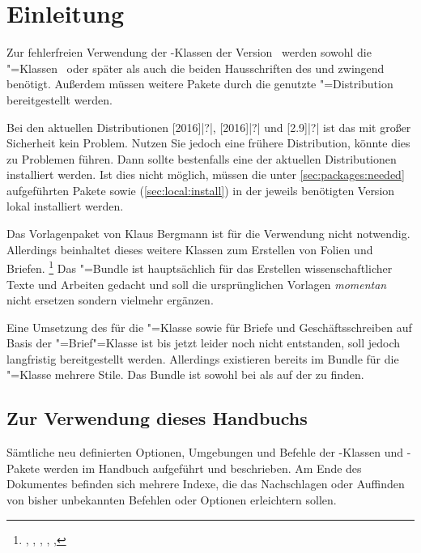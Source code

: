 \chapter{Einleitung}
%
Zur fehlerfreien Verwendung der \TUDScript-Klassen der Version~\vTUDScript{} 
werden sowohl die \KOMAScript"=Klassen~\vKOMAScript{} oder später als auch die 
beiden Hausschriften des \CDs \Univers und \DIN zwingend benötigt. Außerdem 
müssen weitere Pakete durch die genutzte "=Distribution 
bereitgestellt werden. 

Bei den aktuellen Distributionen
%
[2016]|?|,
[2016]|?| und 
[2.9]|?|
ist das mit großer Sicherheit kein Problem. Nutzen Sie jedoch eine frühere 
Distribution, könnte dies zu Problemen führen. Dann sollte bestenfalls eine der 
aktuellen Distributionen installiert werden. Ist dies nicht möglich, müssen die 
unter \autoref{sec:packages:needed} aufgeführten Pakete sowie \TUDScript 
(\autoref{sec:local:install}) in der jeweils benötigten Version lokal 
installiert werden.

Das Vorlagenpaket von Klaus Bergmann ist für die Verwendung nicht notwendig. 
Allerdings beinhaltet dieses weitere Klassen zum Erstellen von Folien 
und Briefen.%
\footnote{%
  , , , , 
  , %
}
Das \TUDScript"=Bundle ist hauptsächlich für das Erstellen wissenschaftlicher 
Texte und Arbeiten gedacht und soll die ursprünglichen Vorlagen \emph{momentan} 
nicht ersetzen sondern vielmehr ergänzen. 

Eine Umsetzung des \CDs für die "=Klasse sowie für Briefe und 
Geschäftsschreiben auf Basis der \KOMAScript"=Brief"=Klasse  
ist bis jetzt leider noch nicht entstanden, soll jedoch langfristig 
bereitgestellt werden. Allerdings existieren bereits im Bundle 
 für die "=Klasse mehrere Stile. Das Bundle 
ist sowohl bei  als auf der 
 zu 
finden.



\section{Zur Verwendung dieses Handbuchs}
Sämtliche neu definierten Optionen, Umgebungen und Befehle der 
\TUDScript-Klassen und \TUDScript-Pakete werden im Handbuch aufgeführt und 
beschrieben. Am Ende des Dokumentes befinden sich mehrere Indexe, die das 
Nachschlagen oder Auffinden von bisher unbekannten Befehlen oder Optionen 
erleichtern sollen.

